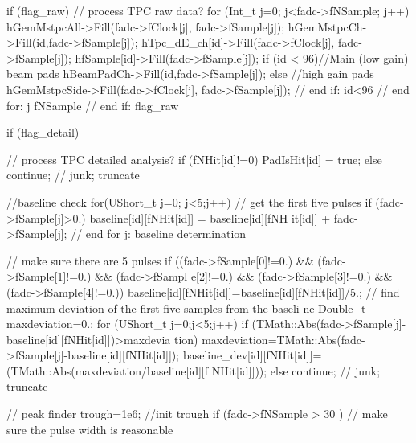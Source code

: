 \begin{DoxyCode}
{{{{{{{{{{          if (flag_raw) {// process TPC raw data?
            for (Int_t j=0; j<fadc->fNSample; j++) {
              hGemMstpcAll->Fill(fadc->fClock[j], fadc->fSample[j]);
              hGemMstpcCh->Fill(id,fadc->fSample[j]);
              hTpc_dE_ch[id]->Fill(fadc->fClock[j], fadc->fSample[j]);
              hfSample[id]->Fill(fadc->fSample[j]);
              if (id < 96){//Main (low gain) beam pads
                   hBeamPadCh->Fill(id,fadc->fSample[j]); 
              }
              else {//high gain pads
                 hGemMstpcSide->Fill(fadc->fClock[j], fadc->fSample[j]);
              } // end if: id<96
            } // end for: j fNSample
          } // end if: flag_raw

          if (flag_detail) { // process TPC detailed analysis?
            if (fNHit[id]!=0) PadIsHit[id] = true;
            else continue; // junk; truncate
            
            //baseline check 
            for(UShort_t j=0; j<5;j++){ // get the first five pulses
              if (fadc->fSample[j]>0.) baseline[id][fNHit[id]] = baseline[id][fNH
      it[id]] + fadc->fSample[j]; 
            } // end for j: baseline determination
            
            // make sure there are 5 pulses
            if ((fadc->fSample[0]!=0.) && (fadc->fSample[1]!=0.) && (fadc->fSampl
      e[2]!=0.) && (fadc->fSample[3]!=0.) && (fadc->fSample[4]!=0.)){
              baseline[id][fNHit[id]]=baseline[id][fNHit[id]]/5.;
              // find maximum deviation of the first five samples from the baseli
      ne
              Double_t maxdeviation=0.;
              for (UShort_t j=0;j<5;j++){
                if (TMath::Abs(fadc->fSample[j]-baseline[id][fNHit[id]])>maxdevia
      tion) maxdeviation=TMath::Abs(fadc->fSample[j]-baseline[id][fNHit[id]]);
              }
              baseline_dev[id][fNHit[id]]=(TMath::Abs(maxdeviation/baseline[id][f
      NHit[id]]));
            }
            else continue; // junk; truncate
        
            // peak finder
            trough=1e6; //init trough
            if (fadc->fNSample > 30 )  // make sure the pulse width is reasonable
      
}}}}}}}}}}}
\end{DoxyCode}
